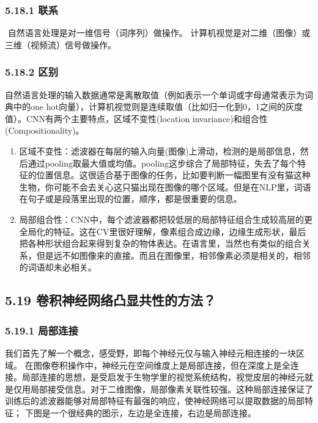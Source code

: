 \subsubsection{5.18.1 联系}\label{ux8054ux7cfb}

​ 自然语言处理是对一维信号（词序列）做操作。 ​
计算机视觉是对二维（图像）或三维（视频流）信号做操作。

\subsubsection{5.18.2 区别}\label{ux533aux522b}

​
自然语言处理的输入数据通常是离散取值（例如表示一个单词或字母通常表示为词典中的one
hot向量），计算机视觉则是连续取值（比如归一化到0，1之间的灰度值）。CNN有两个主要特点，区域不变性(location
invariance)和组合性(Compositionality)。

\begin{enumerate}
\def\labelenumi{\arabic{enumi}.}
\tightlist
\item
  区域不变性：滤波器在每层的输入向量(图像)上滑动，检测的是局部信息，然后通过pooling取最大值或均值。pooling这步综合了局部特征，失去了每个特征的位置信息。这很适合基于图像的任务，比如要判断一幅图里有没有猫这种生物，你可能不会去关心这只猫出现在图像的哪个区域。但是在NLP里，词语在句子或是段落里出现的位置，顺序，都是很重要的信息。
\item
  局部组合性：CNN中，每个滤波器都把较低层的局部特征组合生成较高层的更全局化的特征。这在CV里很好理解，像素组合成边缘，边缘生成形状，最后把各种形状组合起来得到复杂的物体表达。在语言里，当然也有类似的组合关系，但是远不如图像来的直接。而且在图像里，相邻像素必须是相关的，相邻的词语却未必相关。
\end{enumerate}

\subsection{5.19
卷积神经网络凸显共性的方法？}\label{ux5377ux79efux795eux7ecfux7f51ux7edcux51f8ux663eux5171ux6027ux7684ux65b9ux6cd5}

\subsubsection{5.19.1 局部连接}\label{ux5c40ux90e8ux8fdeux63a5}

​
我们首先了解一个概念，感受野，即每个神经元仅与输入神经元相连接的一块区域。
在图像卷积操作中，神经元在空间维度上是局部连接，但在深度上是全连接。局部连接的思想，是受启发于生物学里的视觉系统结构，视觉皮层的神经元就是仅用局部接受信息。对于二维图像，局部像素关联性较强。这种局部连接保证了训练后的滤波器能够对局部特征有最强的响应，使神经网络可以提取数据的局部特征；
下图是一个很经典的图示，左边是全连接，右边是局部连接。

